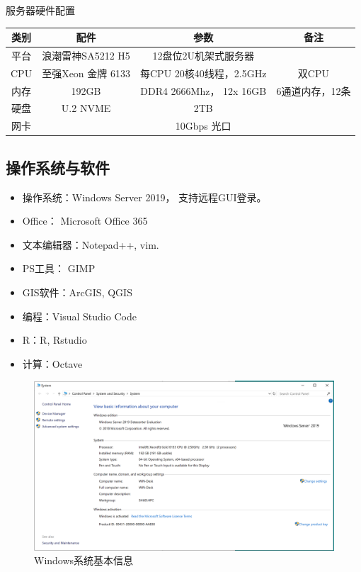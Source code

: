 \documentclass[
]{ctexbook}
\providecommand{\tightlist}{%
  \setlength{\itemsep}{0pt}\setlength{\parskip}{0pt}}
\begin{document}
服务器硬件配置

\begin{longtable}[]{@{}cccc@{}}
\toprule\noalign{}
类别 & 配件 & 参数 & 备注 \\
\midrule\noalign{}
\endhead
\bottomrule\noalign{}
\endlastfoot
平台 & 浪潮雷神SA5212 H5 & 12盘位2U机架式服务器 & \\
CPU & 至强Xeon 金牌 6133 & 每CPU 20核40线程，2.5GHz & 双CPU \\
内存 & 192GB & DDR4 2666Mhz， 12x 16GB & 6通道内存，12条 \\
硬盘 & U.2 NVME & 2TB & \\
网卡 & & 10Gbps 光口 & \\
\end{longtable}

\hypertarget{ux64cdux4f5cux7cfbux7edfux4e0eux8f6fux4ef6}{%
\subsection{操作系统与软件}\label{ux64cdux4f5cux7cfbux7edfux4e0eux8f6fux4ef6}}

\begin{itemize}
\tightlist
\item
  操作系统：Windows Server 2019， 支持远程GUI登录。
\item
  Office： Microsoft Office 365
\item
  文本编辑器：Notepad++, vim.
\item
  PS工具： GIMP
\item
  GIS软件：ArcGIS, QGIS
\item
  编程：Visual Studio Code
\item
  R：R, Rstudio
\item
  计算：Octave
\end{itemize}

\begin{figure}
\centering
\includegraphics{Fig/ch5/host_win.png}
\caption{Windows系统基本信息}
\end{figure}
\end{document}
